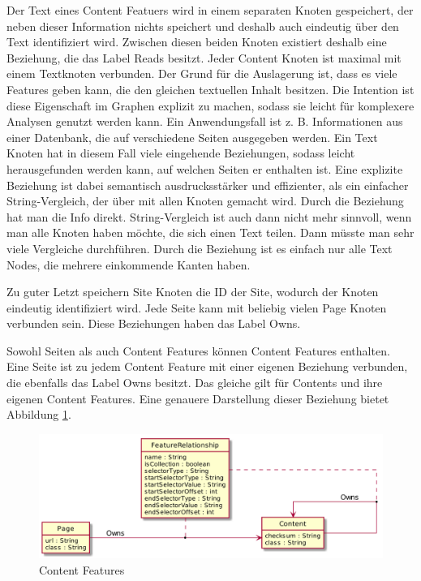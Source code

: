     Der Text eines Content Featuers wird in einem separaten Knoten gespeichert,
    der neben dieser Information nichts speichert und deshalb auch eindeutig über den Text identifiziert wird.
    Zwischen diesen beiden Knoten existiert deshalb eine Beziehung, die das Label Reads besitzt.
    Jeder Content Knoten ist maximal mit einem Textknoten verbunden.
    Der Grund für die Auslagerung ist, dass es viele Features geben kann, die den gleichen textuellen Inhalt besitzen.
    Die Intention ist diese Eigenschaft im Graphen explizit zu machen,
    sodass sie leicht für komplexere Analysen genutzt werden kann.
    Ein Anwendungsfall ist z. B. Informationen aus einer Datenbank,
    die auf verschiedene Seiten ausgegeben werden.
    Ein Text Knoten hat in diesem Fall viele eingehende Beziehungen,
    sodass leicht herausgefunden werden kann, auf welchen Seiten er enthalten ist.
    Eine explizite Beziehung ist dabei semantisch ausdrucksstärker und effizienter,
    als ein einfacher String-Vergleich, der über mit allen Knoten gemacht wird.
    Durch die Beziehung hat man die Info direkt.
    String-Vergleich ist auch dann nicht mehr sinnvoll, wenn man alle Knoten haben möchte,
    die sich einen Text teilen.
    Dann müsste man sehr viele Vergleiche durchführen.
    Durch die Beziehung ist es einfach nur alle Text Nodes, die mehrere einkommende Kanten haben.

    Zu guter Letzt speichern Site Knoten die ID der Site, wodurch der Knoten eindeutig identifiziert wird.
    Jede Seite kann mit beliebig vielen Page Knoten verbunden sein.
    Diese Beziehungen haben das Label Owns.

    Sowohl Seiten als auch Content Features können Content Features enthalten.
    Eine Seite ist zu jedem Content Feature mit einer eigenen Beziehung verbunden,
    die ebenfalls das Label Owns besitzt.
    Das gleiche gilt für Contents und ihre eigenen Content Features.
    Eine genauere Darstellung dieser Beziehung bietet Abbildung \ref{image:dbDataModelContentRelationship}.

    \begin{figure}
        \centering
        \includegraphics[scale=\imageScalingFactor]{../resources/db-data-model/content-relationship.png}
        \caption{Content Features}
        \label{image:dbDataModelContentRelationship}
    \end{figure}

